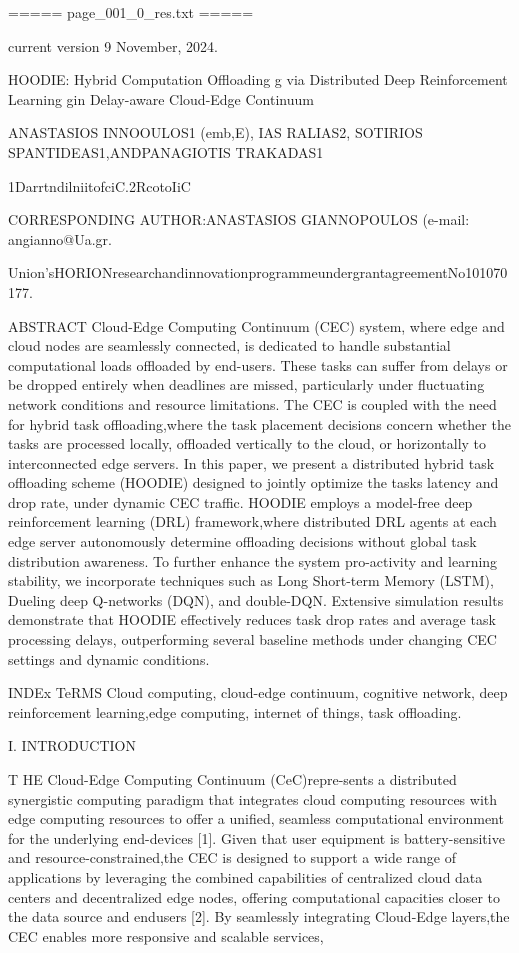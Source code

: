 \documentclass{article}
\begin{document}
===== page\_001\_0\_res.txt =====


current version 9 November, 2024.

HOODIE: Hybrid Computation  Offloading g via Distributed Deep  Reinforcement Learning gin  Delay-aware Cloud-Edge Continuum

ANASTASIOS INNOOULOS1 (emb,E), IAS RALIAS2, SOTIRIOS SPANTIDEAS1,ANDPANAGIOTIS TRAKADAS1

1DarrtndilniitofciC.2RcotoIiC

CORRESPONDING AUTHOR:ANASTASIOS GIANNOPOULOS (e-mail: angianno@Ua.gr.

Union'sHORIONresearchandinnovationprogrammeundergrantagreementNo101070177.

ABSTRACT Cloud-Edge Computing Continuum (CEC) system, where edge and cloud nodes are seamlessly connected, is dedicated to handle substantial computational loads offloaded by end-users. These tasks can suffer from delays or be dropped entirely when deadlines are missed, particularly under fluctuating network conditions and resource limitations. The CEC is coupled with the need for hybrid task offloading,where the task placement decisions concern whether the tasks are processed locally, offloaded vertically to the cloud, or horizontally to interconnected edge servers. In this paper, we present a distributed hybrid task offloading scheme (HOODIE) designed to jointly optimize the tasks latency and drop rate, under dynamic CEC traffic. HOODIE employs a model-free deep reinforcement learning (DRL) framework,where distributed DRL agents at each edge server autonomously determine offloading decisions without global task distribution awareness. To further enhance the system pro-activity and learning stability, we incorporate techniques such as Long Short-term Memory (LSTM), Dueling deep Q-networks (DQN), and double-DQN. Extensive simulation results demonstrate that HOODIE effectively reduces task drop rates and average task processing delays, outperforming several baseline methods under changing CEC settings and dynamic conditions.

INDEx TeRMS Cloud computing, cloud-edge continuum, cognitive network, deep reinforcement learning,edge computing, internet of things, task offloading.

I. INTRODUCTION

T HE Cloud-Edge Computing Continuum (CeC)repre-sents a distributed synergistic computing paradigm that integrates cloud computing resources with edge computing resources to offer a unified, seamless computational environment for the underlying end-devices [1]. Given that user equipment is battery-sensitive and resource-constrained,the CEC is designed to support a wide range of applications by leveraging the combined capabilities of centralized cloud data centers and decentralized edge nodes, offering computational capacities closer to the data source and endusers [2]. By seamlessly integrating Cloud-Edge layers,the CEC enables more responsive and scalable services,
\end{document}
